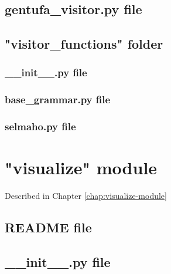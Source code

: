 \section{gentufa\_visitor.py file}



\section{"visitor\_functions" folder}

\subsection{\_\_init\_\_.py file}



\subsection{base\_grammar.py file}



\subsection{selmaho.py file}



\chapter{"visualize" module}
\label{appendix:visualize-annex}

Described in Chapter \ref{chap:visualize-module}

\section{README file}



\section{\_\_init\_\_.py file}

